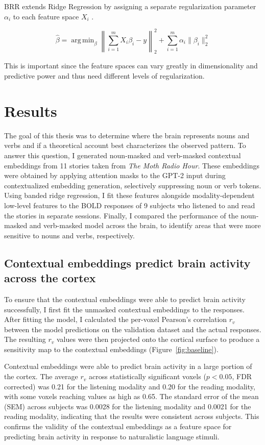 \documentclass[a4paper]{article}
\DeclareMathOperator*{\argmin}{arg\,min}
\begin{document}
BRR extends Ridge Regression by assigning a separate regularization parameter $\alpha_i$ to each feature space $X_i$ \parencite{nunez_voxelwise_2019}.
 
\begin{equation*}
    \hat{\beta} = \argmin_{\beta} \left\lVert \sum^{m}_{i=1} X_i \beta_i - y \right\rVert^2_2
    + \sum^{m}_{i=1} \alpha_i \lVert \beta_i \rVert^2_2
\end{equation*}
 
This is important since the feature spaces can vary greatly in dimensionality and predictive power and thus need different levels of regularization.

\section*{Results} 
The goal of this thesis was to determine where the brain represents nouns and verbs and if a theoretical account best characterizes the observed pattern. To answer this question, I generated noun-masked and verb-masked contextual embeddings from 11 stories taken from \textit{The Moth Radio Hour}. These embeddings were obtained by applying attention masks to the GPT-2 input during contextualized embedding generation, selectively suppressing noun or verb tokens. Using banded ridge regression, I fit these features alongside modality-dependent low-level features to the BOLD responses of 9 subjects who listened to and read the stories in separate sessions. Finally, I compared the performance of the noun-masked and verb-masked model across the brain, to identify areas that were more sensitive to nouns and verbs, respectively.

\subsection*{Contextual embeddings predict brain activity across the cortex}
To ensure that the contextual embeddings were able to predict brain activity successfully, I first fit the unmasked contextual embeddings to the responses. After fitting the model, I calculated the per-voxel Pearson's correlation $r_v$ between the model predictions on the validation dataset and the actual responses. The resulting $r_v$ values were then projected onto the cortical surface to produce a sensitivity map to the contextual embeddings (Figure~\ref{fig:baseline}).

Contextual embeddings were able to predict brain activity in a large portion of the cortex. The average $r_v$ across statistically significant voxels ($p < 0.05$, FDR corrected) was 0.21 for the listening modality and 0.20 for the reading modality, with some voxels reaching values as high as 0.65. The standard error of the mean (SEM) across subjects was 0.0028 for the listening modality and 0.0021 for the reading modality, indicating that the results were consistent across subjects. This confirms the validity of the contextual embeddings as a feature space for predicting brain activity in response to naturalistic language stimuli.
\end{document}
